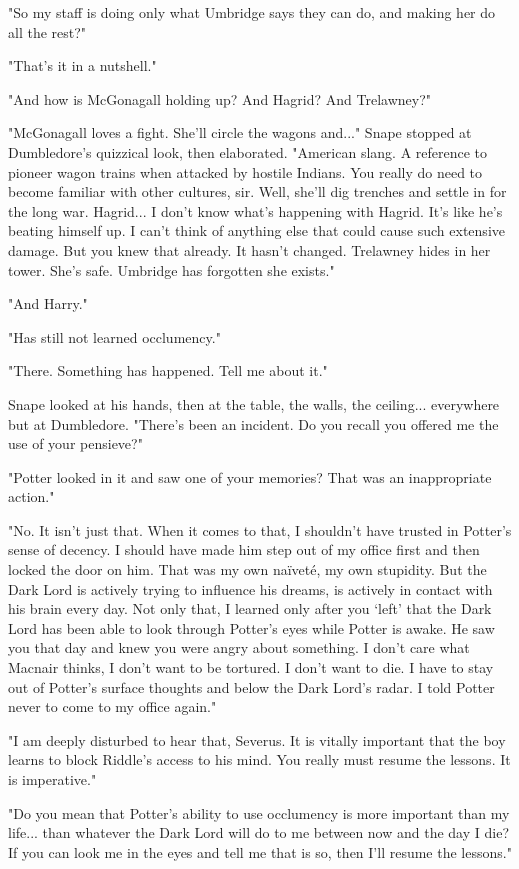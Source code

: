 "So my staff is doing only what Umbridge says they can do, and making her do all the rest?"

"That's it in a nutshell."

"And how is McGonagall holding up? And Hagrid? And Trelawney?"

"McGonagall loves a fight. She'll circle the wagons and..." Snape stopped at Dumbledore's quizzical look, then elaborated. "American slang. A reference to pioneer wagon trains when attacked by hostile Indians. You really do need to become familiar with other cultures, sir. Well, she'll dig trenches and settle in for the long war. Hagrid... I don't know what's happening with Hagrid. It's like he's beating himself up. I can't think of anything else that could cause such extensive damage. But you knew that already. It hasn't changed. Trelawney hides in her tower. She's safe. Umbridge has forgotten she exists."

"And Harry."

"Has still not learned occlumency."

"There. Something has happened. Tell me about it."

Snape looked at his hands, then at the table, the walls, the ceiling... everywhere but at Dumbledore. "There's been an incident. Do you recall you offered me the use of your pensieve?"

"Potter looked in it and saw one of your memories? That was an inappropriate action."

"No. It isn't just that. When it comes to that, I shouldn't have trusted in Potter's sense of decency. I should have made him step out of my office first and then locked the door on him. That was my own naïveté, my own stupidity. But the Dark Lord is actively trying to influence his dreams, is actively in contact with his brain every day. Not only that, I learned only after you `left' that the Dark Lord has been able to look through Potter's eyes while Potter is awake. He saw you that day and knew you were angry about something. I don't care what Macnair thinks, I don't want to be tortured. I don't want to die. I have to stay out of Potter's surface thoughts and below the Dark Lord's radar. I told Potter never to come to my office again."

"I am deeply disturbed to hear that, Severus. It is vitally important that the boy learns to block Riddle's access to his mind. You really must resume the lessons. It is imperative."

"Do you mean that Potter's ability to use occlumency is more important than my life... than whatever the Dark Lord will do to me between now and the day I die? If you can look me in the eyes and tell me that is so, then I'll resume the lessons."


